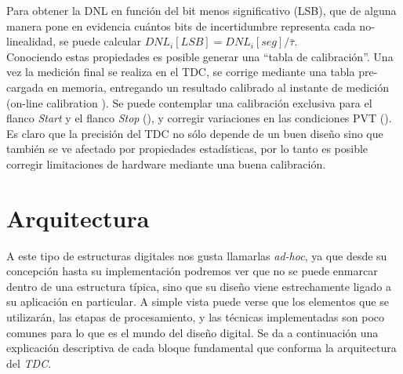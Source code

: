 Para obtener la DNL en función del bit menos significativo (LSB), que de alguna manera
pone en evidencia cuántos bits de incertidumbre representa cada no-linealidad, 
se puede calcular $DNL_i[LSB] = DNL_i[seg] / \bar{\tau}$.\\
Conociendo estas propiedades es posible generar una ``tabla de calibración''. Una vez la medición final
se realiza en el TDC, se corrige mediante una tabla pre-cargada en memoria, entregando un resultado
calibrado al instante de medición (on-line calibration \cite{Liu2015}). Se puede contemplar
una calibración exclusiva para el flanco \textit{Start} y el flanco \textit{Stop} (\cite{Khaddour2023}), y 
corregir variaciones en las condiciones PVT (\cite{Qin2017}).
Es claro que la precisión del TDC no sólo depende de un buen diseño sino que también 
se ve afectado por propiedades estadísticas, por lo tanto es posible corregir limitaciones de
hardware mediante una buena calibración.\\






\section{Arquitectura}

A este tipo de estructuras digitales nos gusta llamarlas \textit{ad-hoc}, ya que desde su concepción hasta su
implementación podremos ver que no se puede enmarcar dentro de una estructura típica, sino que su diseño viene estrechamente ligado
a su aplicación en particular. A simple vista puede verse que los elementos que se utilizarán, las etapas de procesamiento,
y las técnicas implementadas son poco comunes para lo que es el mundo del diseño digital. Se da a continuación 
una explicación descriptiva de cada bloque fundamental que conforma la arquitectura del \textit{TDC}.

